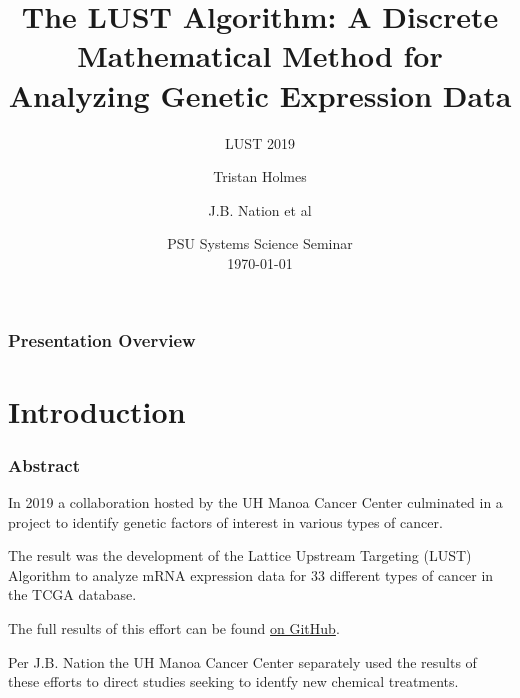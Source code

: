 \documentclass[
	11pt, %
]{beamer}
\title[LUST 2019]{The LUST Algorithm: A Discrete Mathematical Method for Analyzing Genetic Expression Data} %
\subtitle{LUST 2019} %
\author[Holmes \and Nation et al]{Tristan Holmes \and J.B. Nation et al} %
\institute[UH]{University of Hawaii at Manoa \\ \smallskip \textit{tristanh314@gmail.com}} %
\date[\today]{PSU Systems Science Seminar\\ \today} %
\begin{document}

\begin{frame}
	\titlepage
\end{frame}



\begin{frame}
	\frametitle{Presentation Overview}
	
	\tableofcontents
\end{frame}


\section{Introduction} 

\begin{frame}
	\frametitle{Abstract}
	
	In 2019 a collaboration hosted by the UH Manoa Cancer Center culminated in a project to identify genetic factors of interest in various types of cancer.
	\pause
	\bigskip 

	The result was the development of the Lattice Upstream Targeting (LUST) Algorithm to analyze mRNA expression data for 33 different types of cancer in the TCGA database.
	\pause
    \bigskip

    The full results of this effort can be found \href{https://github.com/tristanh314/lust-cancer-2019}{on GitHub}.
    \pause
	\bigskip 

    Per J.B. Nation the UH Manoa Cancer Center separately used the results of these efforts to direct studies seeking to identfy new chemical treatments.
\end{frame}
\end{document}
